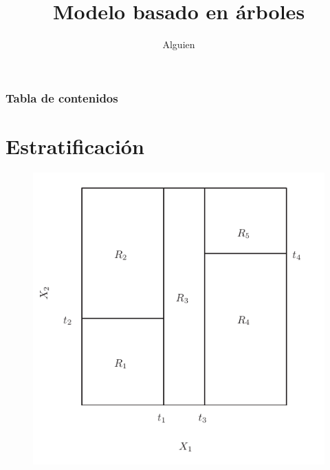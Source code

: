 \documentclass{beamer}
\title{Modelo basado en árboles}
\author{Alguien}
\institute{Universidad de Sevilla}
\date{}
\theoremstyle{definition}
\begin{document}
\frame{\titlepage}

\begin{frame}
\frametitle{Tabla de contenidos}
\tableofcontents
\end{frame}

\section{Estratificación}

\begin{frame}
\begin{figure}[h!]
\includegraphics[scale=0.4]{regiones}
\end{figure}
\end{frame}
\end{document}
